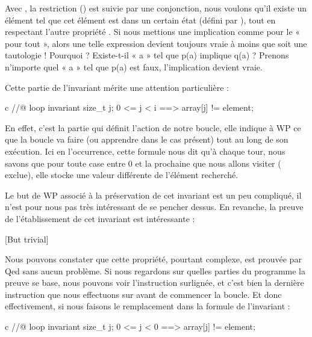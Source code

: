 Avec , la restriction () est suivie
par une conjonction, nous voulons qu'il existe un élément tel que cet élément 
est dans un certain état (défini par ), tout en respectant l'autre 
propriété . Si nous mettions une implication comme pour le « pour tout », 
alors une telle expression devient toujours vraie à moins que  soit une 
tautologie ! Pourquoi ? Existe-t-il « a » tel que p(a) implique q(a) ? Prenons 
n'importe quel « a » tel que p(a) est faux, l'implication devient vraie.



Cette partie de l'invariant mérite une attention particulière :



\begin{CodeBlock}{c}
//@ loop invariant \forall size_t j; 0 <= j < i ==> array[j] != element;
\end{CodeBlock}



En effet, c'est la partie qui définit l'action de notre boucle, elle indique à
WP ce que la boucle va faire (ou apprendre dans le cas présent) tout au long de
son exécution. Ici en l'occurrence, cette formule nous dit qu'à chaque tour, nous 
savons que pour toute case entre 0 et la prochaine que nous allons visiter ( exclue), elle stocke une valeur différente de l'élément recherché.



Le but de WP associé à la préservation de cet invariant est un peu compliqué, il
n'est pour nous pas très intéressant de se pencher dessus. En revanche, la 
preuve de l'établissement de cet invariant est intéressante :



[But trivial]


Nous pouvons constater que cette propriété, pourtant complexe, est prouvée par 
Qed sans aucun problème. Si nous regardons sur quelles parties du programme la 
preuve se base, nous pouvons voir l'instruction  surlignée, et c'est 
bien la dernière instruction que nous effectuons sur  avant de commencer
la boucle. Et donc effectivement, si nous faisons le remplacement dans la formule 
de l'invariant :



\begin{CodeBlock}{c}
//@ loop invariant \forall size_t j; 0 <= j < 0 ==> array[j] != element;
\end{CodeBlock}



